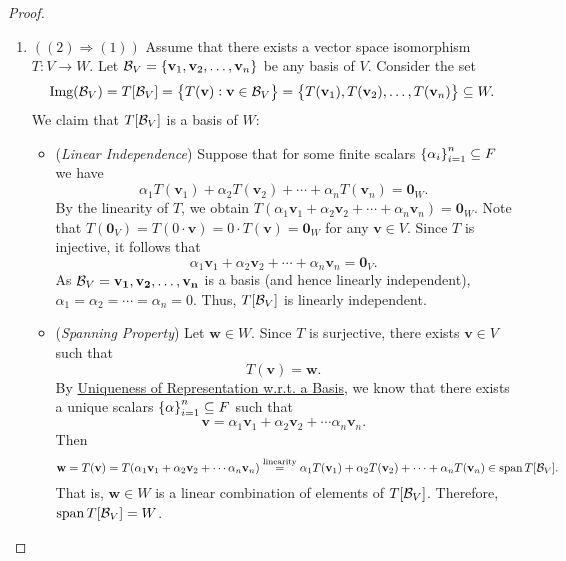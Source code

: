 \documentclass[11pt,openany]{article}
\renewcommand{\vec}[1]{\mathbf{#1}}
\begin{document}
\newpage
{}
\begin{proof}
\begin{enumerate}[]
	\item $((2)\Rightarrow (1))$ Assume that there exists a vector space isomorphism $T:V\to W$. Let $\basis_V=\set{\vec{v}_1,\vec{v}_2,\dots,\vec{v}_n}$ be any basis of $V$. Consider the set \[
	\img{\basis_V}=T[\basis_V]=\set{T(\vec{v}):\vec{v}\in \basis_V}=\set{T(\vec{v}_1),T(\vec{v}_2),\dots,T(\vec{v}_n)}\subseteq W.
	\] We claim that $T[\mathcal{B}_V]$ is a basis of $W$: \begin{itemize}
		\item (\textit{Linear Independence}) Suppose that for some finite scalars $\set{\alpha_i}_{i=1}^n\subseteq F$ we have \[
		\alpha_1T(\vec{v}_1)+\alpha_2T(\vec{v}_2)+\cdots+\alpha_nT(\vec{v}_n)=\vec{0}_W.
		\] By the linearity of $T$, we obtain $T(\alpha_1\vec{v}_1+\alpha_2\vec{v}_2+\cdots+\alpha_n\vec{v}_n)=\vec{0}_W$. Note that $T(\vec{0}_V)=T(0\cdot\vec{v})=0\cdot T(\vec{v})=\vec{0}_W$ for any $\vec{v}\in V$. Since $T$ is injective, it follows that \[
		\alpha_1\vec{v}_1+\alpha_2\vec{v}_2+\cdots+\alpha_n\vec{v}_n=\vec{0}_V.
		\] As $\basis_V=\vec{v_1,\vec{v}_2,\dots,\vec{v}_n}$ is a basis (and hence linearly independent), $\alpha_1=\alpha_2=\cdots=\alpha_n=0$. Thus, $T[\mathcal{B}_V]$ is linearly independent.
		\item (\textit{Spanning Property}) Let $\vec{w}\in W$. Since $T$ is surjective, there exists $\vec{v}\in V$ such that \[
		T(\vec{v})=\vec{w}.
		\] By \hyperlink{unique-wrt-basis}{Uniqueness of Representation w.r.t. a Basis}, we know that there exists a unique scalars $\set{\alpha}_{i=1}^n\subseteq F$ such that \[
		\vec{v}=\alpha_1\vec{v}_1+\alpha_2\vec{v}_2+\cdots\alpha_n\vec{v}_n.
		\] Then \[
		\vec{w}=T(\vec{v})=T(\alpha_1\vec{v}_1+\alpha_2\vec{v}_2+\cdots\alpha_n\vec{v}_n)\overset{\text{linearity}}{=}\alpha_1 T(\vec{v}_1)+\alpha_2 T(\vec{v}_2) + \cdots +\alpha_n T(\vec{v}_n)\in \Span T[\basis_V].
		\] That is, $\vec{w}\in W$ is a linear combination of elements of $T[\mathcal{B}_V]$. Therefore, $\operatorname{\normalfont span} T[\mathcal{B}_V]=W$.

\end{itemize}
\end{enumerate}
\end{proof}
\end{document}
